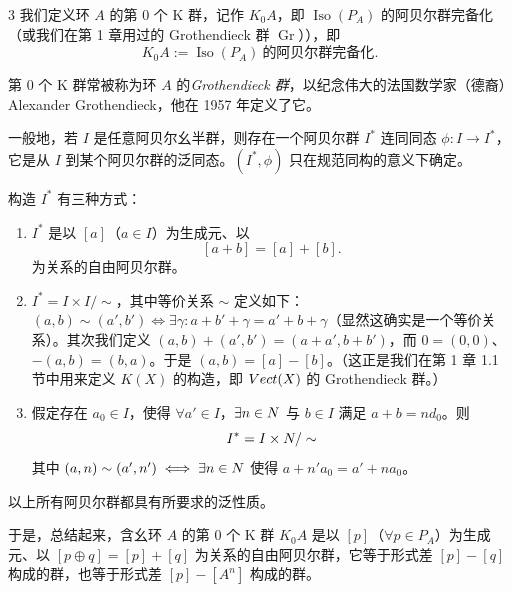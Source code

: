 \begin{defn}{3} 我们定义环 $A$ 的第 0 个 K 群，记作 $K_0A$，即 $\operatorname{Iso}(P_A)$ 的阿贝尔群完备化（或我们在第 1 章用过的 Grothendieck 群 $\operatorname{Gr}$）），即
\[ K_0A := \operatorname{Iso}(P_A)\ \text{的阿贝尔群完备化}. \]
\end{defn}

第 0 个 K 群常被称为环 $A$ 的\emph{Grothendieck 群}，以纪念伟大的法国数学家（德裔）Alexander Grothendieck，他在 1957 年定义了它。

一般地，若 $I$ 是任意阿贝尔幺半群，则存在一个阿贝尔群 $I^*$ 连同同态 $\phi : I \to I^*$，它是从 $I$ 到某个阿贝尔群的泛同态。$(I^*, \phi)$ 只在规范同构的意义下确定。

构造 $I^*$ 有三种方式：
\begin{enumerate}[label=\arabic*.]
\item $I^*$ 是以 $[a]$（$a \in I$）为生成元、以
\[ [a + b] = [a] + [b]. \]
为关系的自由阿贝尔群。

\item $I^* = I \times I/\sim$，其中等价关系 $\sim$ 定义如下：$(a, b) \sim (a', b') \iff \exists\gamma : a + b' + \gamma = a' + b + \gamma$（显然这确实是一个等价关系）。其次我们定义 $(a, b) + (a', b') = (a+a', b+b')$，而 $0 = (0, 0)$、$-(a, b) = (b, a)$。于是 $(a, b) = [a] - [b]$。（这正是我们在第 1 章 1.1 节中用来定义 $K(X)$ 的构造，即 $Vect(X)$ 的 Grothendieck 群。）

\item 假定存在 $a_0 \in I$，使得 $\forall a' \in I$，$\exists n \in N$ 与 $b \in I$ 满足 $a + b = nd_0$。则
\[ I^* = I \times N/\sim \]
其中 $(a, n) \sim (a', n') \iff \exists n \in N$ 使得 $a + n'a_0 = a' + na_0$。
\end{enumerate}

以上所有阿贝尔群都具有所要求的泛性质。

于是，总结起来，含幺环 $A$ 的第 0 个 K 群 $K_0A$ 是以 $[p]$（$\forall p \in P_A$）为生成元、以 $[p \oplus q] = [p] + [q]$ 为关系的自由阿贝尔群，它等于形式差 $[p] - [q]$ 构成的群，也等于形式差 $[p] - [A^n]$ 构成的群。

